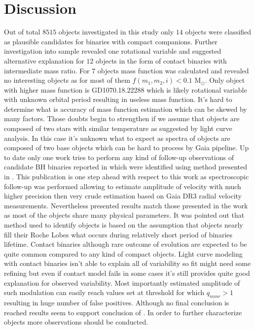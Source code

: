 \documentclass{pracalicmgr}
\begin{document}
\chapter{Discussion}
Out of total $8515$ objects investigated in this study only $14$ objects were classified as plausible candidates for binaries with compact companions.
Further investigation into sample revealed one rotational variable and suggested alternative explanation for $12$ objects in the form of
contact binaries with intermediate mass ratio. For $7$ objects mass function was calculated and revealed no interesting objects as for most of them 
$f(m_1,m_2,i)<0.1$ M$_{\odot}$. Only object with higher mass function is GD1070.18.22288 which is likely rotational variable with unknown orbital period 
resulting in useless mass function. It's hard to determine what is accuracy of mass function estimation  which can be skewed by many factors.
Those doubts begin to strengthen if we assume that objects are composed of two stars with similar temperature as suggested by light curve analysis.
In this case it's unknown what to expect as spectra of objects are composed of two base objects which can be hard to process by Gaia pipeline.
Up to date only one work \citep{nagarajan_spectroscopic_2023} tries to perform any kind of follow-up observations of 
candidate BH binaries reported in \citep{gomel_gaia_2022} which were identified using method presented in \citep{gomel_search_2021}. 
This publication is one step ahead with respect to this work as spectroscopic follow-up was performed allowing to estimate amplitude of velocity 
with much higher precision then very crude estimation based on Gaia DR3 radial velocity measurements. Nevertheless presented results match those 
presented in the work as most of the objects share many physical parameters. It was pointed out that 
method used to identify objects is based on the assumption that objects nearly fill their Roche Lobes what occurs during relatively
short period of binaries lifetime. Contact binaries although rare outcome of evolution are expected to be quite common compared to any kind of compact 
objects. Light curve modeling with contact binaries isn't able to explain all of variability so fit might need some refining but even if 
contact model fails in some cases it's still provides quite good explanation for observed variability. Most importantly estimated amplitude of such 
modulation can easily reach values set at threshold for which $q_{mmr}>1$ resulting in huge number of false positives.
Although no final conclusion is reached results seem to support conclusion of \citep{nagarajan_spectroscopic_2023}. In order to further 
characterize objects more observations should be conducted.
\end{document}

